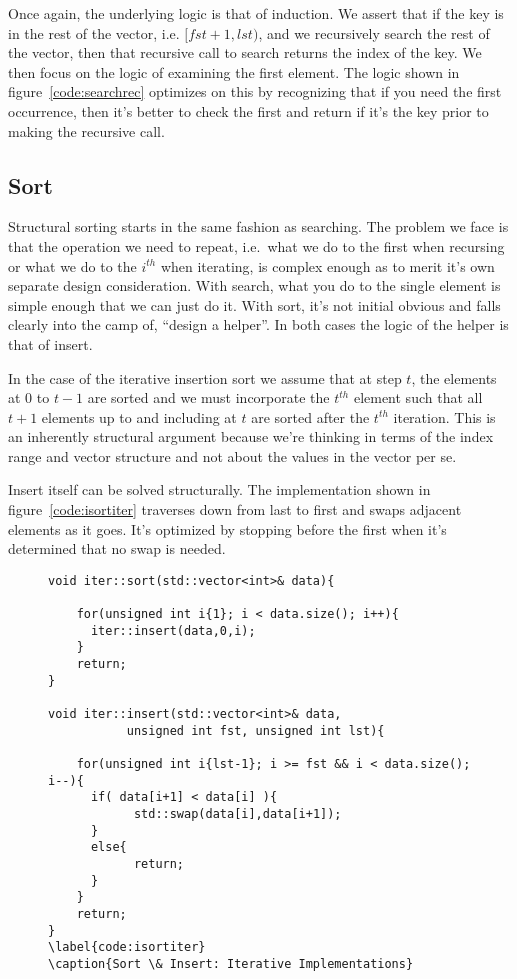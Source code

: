 \documentclass[nobib]{tufte-handout}
\begin{document}
Once again, the underlying logic is that of induction. We assert that if the key is in the rest  of the vector, i.e. $[fst+1,lst)$, and we recursively search the rest of the vector, then that recursive call to search returns the index of the key. We then focus on the logic of examining the first element. The logic shown in figure~\ref{code:searchrec} optimizes on this by recognizing that if you need the first occurrence, then it's better to check the first and return if it's the key prior to making the recursive call. %

\subsection{Sort}

Structural sorting starts in the same fashion as searching. The problem we face is that the operation we need to repeat, i.e.\ what we do to the first when recursing or what we do to the $i^{th}$ when iterating, is complex enough as to merit it's own separate design consideration. With search, what you do to the single element is simple enough that we can just do it. With sort, it's not initial obvious and falls clearly into the camp of, ``design a helper''. In both cases the logic of the helper is that of insert.

In the case of the iterative insertion sort we assume that at step $t$, the elements at $0$ to $t-1$ are sorted and we must incorporate the $t^{th}$ element such that all $t+1$ elements up to and including at $t$ are sorted after the $t^{th}$ iteration. This is an inherently structural argument because we're thinking in terms of the index range and vector structure and not about the values in the vector per se.

Insert itself can be solved structurally. The implementation shown in figure~\ref{code:isortiter} traverses down from last to first and swaps adjacent elements as it goes. It's optimized by stopping before the first when it's determined that no swap is needed. 

\begin{figure}
\begin{lstlisting}
void iter::sort(std::vector<int>& data){

    for(unsigned int i{1}; i < data.size(); i++){
      iter::insert(data,0,i);
    }
    return;
}

void iter::insert(std::vector<int>& data,
		   unsigned int fst, unsigned int lst){

    for(unsigned int i{lst-1}; i >= fst && i < data.size(); i--){
      if( data[i+1] < data[i] ){
		    std::swap(data[i],data[i+1]);
      }
      else{
		    return;
      }
    }
    return;
}
\label{code:isortiter}
\caption{Sort \& Insert: Iterative Implementations}
\end{lstlisting}
\end{figure}
\end{document}
